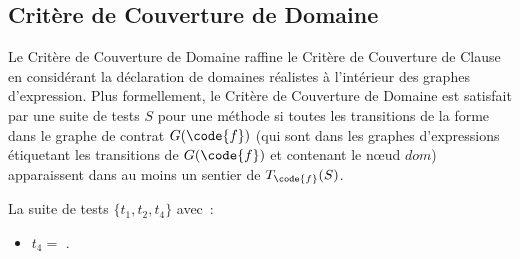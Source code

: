 \subsection{Critère de Couverture de Domaine}

Le Critère de Couverture de Domaine raffine le Critère de Couverture de Clause
en considérant la déclaration de domaines réalistes à l'intérieur des graphes
d'expression. Plus formellement, le Critère de Couverture de Domaine est
satisfait par une suite de tests $S$ pour une méthode  si toutes les
transitions de la forme  dans le graphe de contrat $G(\code{f})$
(qui sont dans les graphes d'expressions étiquetant les transitions de
$G(\code{f})$ et contenant le nœud $\mathit{dom}$) apparaissent dans au moins un
sentier de $T_\code{f}(S)$.

\begin{example}

La suite de tests $\{t_1, t_2, t_4\}$ avec~:
%
\begin{itemize}

\item
$t_4 =$ .


\end{itemize}
\end{example}

